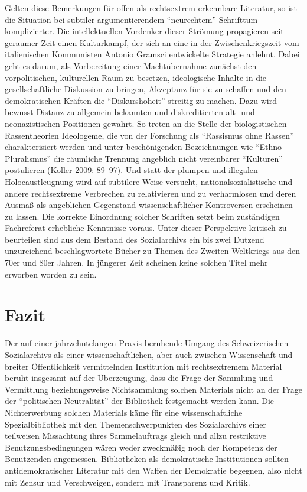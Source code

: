 \documentclass[a4paper,
fontsize=11pt,
oneside,
numbers=noperiodatend,
parskip=half-,
bibliography=totoc,
final
]{scrartcl}
\begin{document}
Gelten diese Bemerkungen für offen als rechtsextrem erkennbare
Literatur, so ist die Situation bei subtiler argumentierendem
\enquote{neurechtem} Schrifttum komplizierter. Die intellektuellen
Vordenker dieser Strömung propagieren seit geraumer Zeit einen
Kulturkampf, der sich an eine in der Zwischenkriegszeit vom
italienischen Kommunisten Antonio Gramsci entwickelte Strategie anlehnt.
Dabei geht es darum, als Vorbereitung einer Machtübernahme zunächst den
vorpolitischen, kulturellen Raum zu besetzen, ideologische Inhalte in
die gesellschaftliche Diskussion zu bringen, Akzeptanz für sie zu
schaffen und den demokratischen Kräften die \enquote{Diskurshoheit}
streitig zu machen. Dazu wird bewusst Distanz zu allgemein bekannten und
diskreditierten alt- und neonazistischen Positionen gewahrt. So treten
an die Stelle der biologistischen Rassentheorien Ideologeme, die von der
Forschung als \enquote{Rassismus ohne Rassen} charakterisiert werden und
unter beschönigenden Bezeichnungen wie \enquote{Ethno-Pluralismus} die
räumliche Trennung angeblich nicht vereinbarer \enquote{Kulturen}
postulieren (Koller 2009: 89--97). Und statt der plumpen und illegalen
Holocaustleugnung wird auf subtilere Weise versucht,
nationalsozialistische und andere rechtsextreme Verbrechen zu
relativieren und zu verharmlosen und deren Ausmaß als angeblichen
Gegenstand wissenschaftlicher Kontroversen erscheinen zu lassen. Die
korrekte Einordnung solcher Schriften setzt beim zuständigen Fachreferat
erhebliche Kenntnisse voraus. Unter dieser Perspektive kritisch zu
beurteilen sind aus dem Bestand des Sozialarchivs ein bis zwei Dutzend
unzureichend beschlagwortete Bücher zu Themen des Zweiten Weltkriegs aus
den 70er und 80er Jahren. In jüngerer Zeit scheinen keine solchen Titel
mehr erworben worden zu sein.

\hypertarget{fazit}{%
\section{Fazit}\label{fazit}}

Der auf einer jahrzehntelangen Praxis beruhende Umgang des
Schweizerischen Sozialarchivs als einer wissenschaftlichen, aber auch
zwischen Wissenschaft und breiter Öffentlichkeit vermittelnden
Institution mit rechtsextremem Material beruht insgesamt auf der
Überzeugung, dass die Frage der Sammlung und Vermittlung beziehungsweise
Nichtsammlung solchen Materials nicht an der Frage der
\enquote{politischen Neutralität} der Bibliothek festgemacht werden
kann. Die Nichterwerbung solchen Materials käme für eine
wissenschaftliche Spezialbibliothek mit den Themenschwerpunkten des
Sozialarchivs einer teilweisen Missachtung ihres Sammelauftrags gleich
und allzu restriktive Benutzungsbedingungen wären weder zweckmäßig noch
der Kompetenz der Benutzenden angemessen. Bibliotheken als demokratische
Institutionen sollten antidemokratischer Literatur mit den Waffen der
Demokratie begegnen, also nicht mit Zensur und Verschweigen, sondern mit
Transparenz und Kritik.
\end{document}
